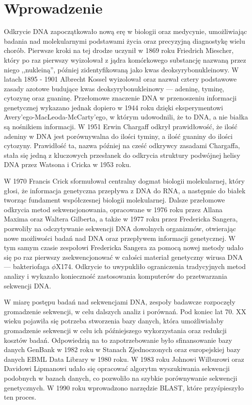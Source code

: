 \cleardoublepage

\section{Wprowadzenie}

    Odkrycie DNA zapoczątkowało nową erę w biologii oraz medycynie, umożliwiając badania nad molekularnymi podstawami życia oraz precyzyjną diagnostykę wielu chorób\cite{Louie:2000}. Pierwsze kroki na tej drodze uczynił w 1869 roku Friedrich Miescher, który po raz pierwszy wyizolował z jądra komórkowego substancję nazwaną przez niego ,,nukleiną''\cite{Dahm:2005}, później zidentyfikowaną jako kwas deoksyrybonukleinowy. W latach 1895 - 1901 Albrecht Kossel wyizolował oraz nazwał cztery podstawowe zasady azotowe budujące kwas deoksyrybonukleinowy — adeninę, tyminę, cytozynę oraz guaninę\cite{Kossel:1893}. Przełomowe znaczenie DNA w przenoszeniu informacji genetycznej wykazano jednak dopiero w 1944 roku dzięki eksperymentowi Avery'ego-MacLeoda-McCarty'ego\cite{Avery:1944}, w którym udowodnili, że to DNA, a nie białka są nośnikiem informacji. W 1951 Erwin Chargaff odkrył prawidłowość, że ilość adeniny w DNA jest porównywalna do ilości tyminy, a ilość guaniny do ilości cytozyny\cite{Chargaff:1952}. Prawidłość ta, nazwa później na cześć odkrywcy zasadami Chargaffa, stała się jedną z kluczowych przesłanek do odkrycia struktury podwójnej helisy DNA przez Watsona i Cricka w 1953 roku\cite{Watson:1953}.

    W 1970 Francis Crick sformułował centralny dogmat biologii molekularnej\cite{Crick:1970}, który głosi, że informacja genetyczna przepływa z DNA do RNA, a następnie do białek tworząc fundament współczesnej biologii molekularnej. Dalsze przełomowe odkrycia metod sekwencjonowania, opracowane w 1976 roku przez Allana Maxima oraz Waltera Gilberta\cite{Maxam:1977}, a także w 1977 roku przez Fredericka Sangera\cite{Sanger:1977}, pozwoliły na odczytywanie sekwencji DNA dowolnych organizmów, otwierając nowe możliwości badań nad DNA oraz przepływem informacji genetycznej. W tym samym czasie zespołowi Fredericka Sangera za pomocą nowej metody udało się po raz pierwszy zsekwencjonować w całości materiał genetyczny wirusa DNA — bakteriofaga $\phi{}$X174\cite{Sanger:1977_2}. Odkrycie to uwypukliło ograniczenia tradycyjnych metod analizy i wykazało konieczność zastosowania komputerów do przetwarzania sekwencji DNA\cite{Staden:1979}.

    W miarę postępu badań nad sekwencjami DNA, zespoły badawcze rozpoczęły gromadzenie sekwencji, w celu dalszych analiz i porównań. Pod koniec lat 70. XX wieku pojawiła się potrzeba stworzenia bazy danych, która umożliwiałaby gromadzenie sekwencji w celu ich późniejszego wykorzystania oraz redukcji kosztów badań. Odpowiedzią na to zapotrzebowanie było sfinansowanie bazy danych GenBank w 1982 roku w Stanach Zjednoczonych\cite{Bilofsky:1986} oraz europejskiej bazy danych EBML Data Library w 1980 roku\cite{Higgins:1992}. W 1983 roku Johnowi Wilburowi oraz Davidowi Lipmanowi udało się opracować algorytm wyszukiwania sekwencji podobnych w bazach danych\cite{Wilbur:1983}, co pozwoliło na szybkie porównywanie sekwencji genetycznych. W 1990 roku wprowadzono narzędzie BLAST\cite{Altschul:1990}, które przyśpieszyło ten proces.

